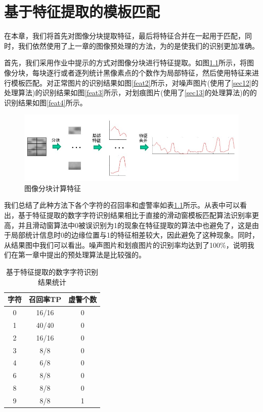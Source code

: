 \documentclass[cn]{elegantbook}
\begin{document}
\chapter{基于特征提取的模板匹配}
\label{sec4}
在本章，我们将首先对图像分块提取特征，最后将特征合并在一起用于匹配，同时，我们依然使用了上一章的图像预处理的方法，为的是使我们的识别更加准确。

首先，我们采用作业中提示的方式对图像分块进行特征提取。如图\ref{feat1}所示，将图像分块，每块逐行或者逐列统计黑像素点的个数作为局部特征，然后使用特征来进行模板匹配。对正常图片的识别结果如图\ref{feat2}所示，对噪声图片(使用了\ref{sec12}的处理算法)的识别结果如图\ref{feat3}所示，对划痕图片(使用了\ref{sec13}的处理算法)的的识别结果如图\ref{feat4}所示。
\begin{figure}[!h]
	\centering
	\includegraphics[width=\textwidth]{feat1}
	\caption{\label{feat1}图像分块计算特征}
\end{figure}

我们总结了此种方法下各个字符的召回率和虚警率如表\ref{tab3}所示。从表中可以看出，基于特征提取的数字字符识别结果相比于直接的滑动窗模板匹配算法识别率更高，并且滑动窗算法中0被误识别为1的现象在特征提取的算法中也避免了，这是由于局部统计信息时0的边缘位置与1的特征相差较大，因此避免了这种现象。同时，从结果图中我们可以看出。噪声图片和划痕图片的识别率均达到了100\%，说明我们在第一章中提出的预处理算法是比较强的。
\begin{table}[!htbp]
	\centering
	\caption{基于特征提取的数字字符识别结果统计}\label{tab3}%
	\begin{tabular}{ccc}
		\toprule
		字符& 召回率TP& 虚警个数\\
		\midrule
		0& 16/16 & 0\\
		1& 40/40 & 0\\
		2& 16/16 & 0\\
		3& 8/8 & 0 \\
		4& 6/8 & 0 \\
		6& 8/8 & 0 \\
		8& 8/8 & 0 \\
		9& 8/8 & 1 \\
		\bottomrule
	\end{tabular}
\end{table}
\end{document}
